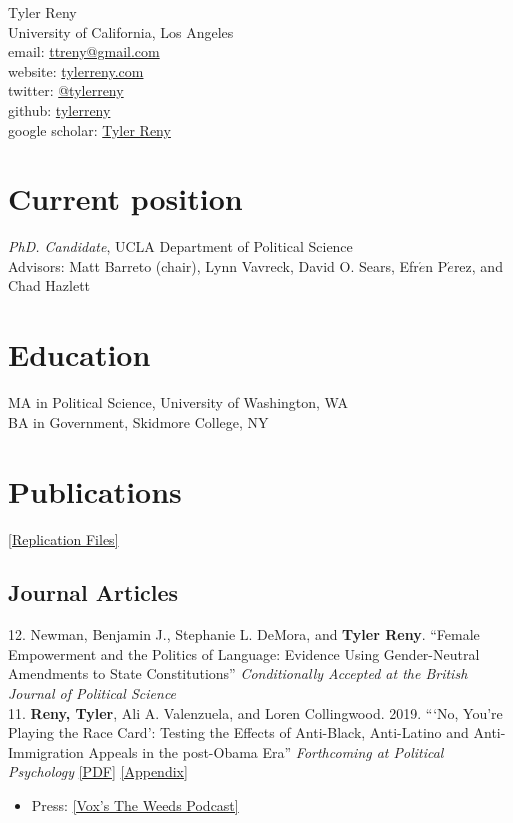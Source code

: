 \documentclass[11pt, a4paper]{article}
\newcommand{\years}[1]{\marginnote{\scriptsize #1}}
\begin{document}
{\LARGE Tyler Reny}\\[1cm]
 University of California, Los Angeles\\
email: \href{mailto:ttreny@gmail.com}{ttreny@gmail.com}\\
website: \href{http://www.tylerreny.com}{tylerreny.com}\\ 
twitter: \href{http://www.twitter.com/tylerreny}{@tylerreny}\\ 
github: \href{https://github.com/tylerreny}{tylerreny}\\ 
google scholar: \href{https://scholar.google.com/citations?user=KTbztQUAAAAJ&hl=en}{Tyler Reny}\\ 

\section*{Current position}
\emph{PhD. Candidate}, UCLA Department of Political Science\\
Advisors: Matt Barreto (chair), Lynn Vavreck, David O. Sears, Efr$\acute{e}$n P$\acute{e}$rez, and Chad Hazlett

\section*{Education}
\years{2015}\textsc{MA} in Political Science, University of Washington, WA\\
\years{2011}\textsc{BA} in Government, Skidmore College, NY

\section*{Publications}

\href{https://dataverse.harvard.edu/dataverse/tylerreny}{[Replication Files]}

\subsection*{Journal Articles}

\years{2020} 12. Newman, Benjamin J., Stephanie L. DeMora, and \textbf{Tyler Reny}. ``Female Empowerment and the Politics of Language: Evidence Using Gender-Neutral Amendments to State Constitutions'' \textit{Conditionally Accepted at the British Journal of Political Science}\\

\years{2019} 11. \textbf{Reny, Tyler}, Ali A. Valenzuela, and Loren Collingwood. 2019. ```No, You’re Playing the Race Card': Testing the Effects of Anti-Black, Anti-Latino and Anti-Immigration Appeals in the post-Obama Era''  \textit{Forthcoming at Political Psychology} \href{http://tylerreny.github.io/pdf/pubs/reny_etal_2019_polpsych.pdf}{[PDF]} \href{http://tylerreny.github.io/pdf/pubs/reny_etal_2019_polpsych_appendix.pdf}{[Appendix]} 
\begin{itemize}
  \item Press: \href{https://megaphone.link/VMP5167113125}{[Vox's The Weeds Podcast]} 
\end{itemize}
\end{document}
